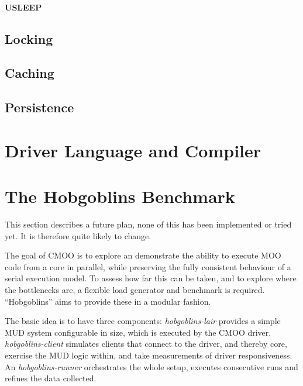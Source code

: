 \documentclass[12pt,a4paper]{article}
\let\oldsection\section
\renewcommand\section{\clearpage\oldsection}
\begin{document}
\vspace{2em}\begin{minipage}{\textwidth}
\paragraph{USLEEP}
\end{minipage}

\subsection{Locking}\label{sec:locking}

\subsection{Caching}\label{sec:caching}

\subsection{Persistence}\label{sec:persistence}

\section{Driver Language and Compiler}\label{sec:compiler}

\section{The Hobgoblins Benchmark}\label{sec:hobgoblins}

\begin{notes}
\item This section describes a future plan, none of this has been implemented or
tried yet. It is therefore quite likely to change.
\end{notes}

The goal of CMOO is to explore an demonstrate the ability to execute MOO code
from a core in parallel, while preserving the fully consistent behaviour of a
serial execution model. To assess how far this can be taken, and to explore where the
bottlenecks are, a flexible load generator and benchmark is required. ``Hobgoblins'' 
aims to provide these in a modular fashion.

The basic idea is to have three components: {\em hobgoblins-lair} provides a
simple MUD system configurable in size, which is executed by the CMOO driver.
{\em hobgoblins-client} simulates clients that connect to the driver, and thereby
core, exercise the MUD logic within, and take measurements of driver
responsiveness. An {\em hobgoblins-runner} orchestrates the whole setup, executes 
consecutive runs and refines the data collected.
\end{document}
